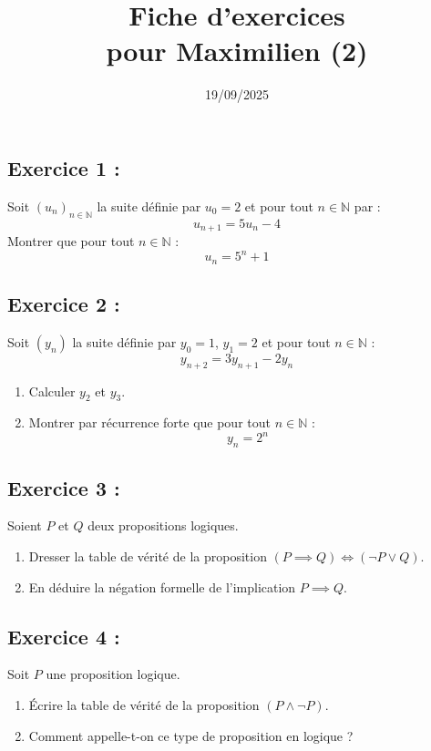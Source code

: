 \documentclass[12pt,a4paper]{article}
\title{Fiche d'exercices \\ pour Maximilien (2)}
\date{19/09/2025}
\author{}
\begin{document}
\maketitle

\subsection*{Exercice 1 :}

Soit $(u_n)_{n \in \mathbb{N}}$ la suite définie par $u_0 = 2$ et pour tout $n \in \mathbb{N}$ par :
\[
u_{n+1} = 5u_n - 4
\]
Montrer que pour tout $n \in \mathbb{N}$ :
\[
u_n = 5^n + 1
\]

\bigskip

\subsection*{Exercice 2 :}

Soit $(y_n)$ la suite définie par $y_0 = 1$, $y_1 = 2$ et pour tout $n \in \mathbb{N}$ :
\[
y_{n+2} = 3y_{n+1} - 2y_n
\]

\begin{enumerate}
    \item Calculer $y_2$ et $y_3$.
    \item Montrer par récurrence forte que pour tout $n \in \mathbb{N}$ :
    \[
    y_n = 2^n
    \]
\end{enumerate}


\bigskip

\subsection*{Exercice 3 :}

Soient $P$ et $Q$ deux propositions logiques.

\begin{enumerate}
    \item Dresser la table de vérité de la proposition $(P \implies Q) \iff (\neg P \lor Q)$.
    \item En déduire la négation formelle de l'implication $P \implies Q$.
\end{enumerate}

\bigskip

\subsection*{Exercice 4 :}

Soit $P$ une proposition logique.
\begin{enumerate}
    \item Écrire la table de vérité de la proposition $(P \land \neg P)$.
    \item Comment appelle-t-on ce type de proposition en logique ?
\end{enumerate}
\end{document}
